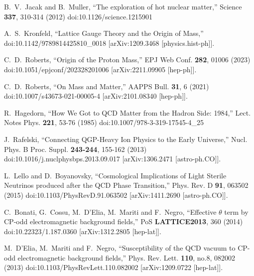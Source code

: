 \documentclass[universe,article,submit,moreauthors,pdftex,a4paper]{Definitions/mdpi}
\begin{document}
\begin{thebibliography}{99}
B.~V.~Jacak and B.~Muller,
``The exploration of hot nuclear matter,''
Science \textbf{337}, 310-314 (2012)
doi:10.1126/science.1215901

A.~S.~Kronfeld,
``Lattice Gauge Theory and the Origin of Mass,''
doi:10.1142/9789814425810\_0018
[arXiv:1209.3468 [physics.hist-ph]].

C.~D.~Roberts,
``Origin of the Proton Mass,''
EPJ Web Conf. \textbf{282}, 01006 (2023)
doi:10.1051/epjconf/202328201006
[arXiv:2211.09905 [hep-ph]].

C.~D.~Roberts,
``On Mass and Matter,''
AAPPS Bull. \textbf{31}, 6 (2021)
doi:10.1007/s43673-021-00005-4
[arXiv:2101.08340 [hep-ph]].

R.~Hagedorn,
``How We Got to QCD Matter from the Hadron Side: 1984,''
Lect. Notes Phys. \textbf{221}, 53-76 (1985)
doi:10.1007/978-3-319-17545-4\_25

J.~Rafelski,
``Connecting QGP-Heavy Ion Physics to the Early Universe,''
Nucl. Phys. B Proc. Suppl. \textbf{243-244}, 155-162 (2013)
doi:10.1016/j.nuclphysbps.2013.09.017
[arXiv:1306.2471 [astro-ph.CO]].

L.~Lello and D.~Boyanovsky,
``Cosmological Implications of Light Sterile Neutrinos produced after the QCD Phase Transition,''
Phys. Rev. D \textbf{91}, 063502 (2015)
doi:10.1103/PhysRevD.91.063502
[arXiv:1411.2690 [astro-ph.CO]].

C.~Bonati, G.~Cossu, M.~D'Elia, M.~Mariti and F.~Negro,
``Effective $\theta$ term by CP-odd electromagnetic background fields,''
PoS \textbf{LATTICE2013}, 360 (2014)
doi:10.22323/1.187.0360
[arXiv:1312.2805 [hep-lat]].

M.~D'Elia, M.~Mariti and F.~Negro,
``Susceptibility of the QCD vacuum to CP-odd electromagnetic background fields,''
Phys. Rev. Lett. \textbf{110}, no.8, 082002 (2013)
doi:10.1103/PhysRevLett.110.082002
[arXiv:1209.0722 [hep-lat]].


\end{thebibliography}
\end{document}
